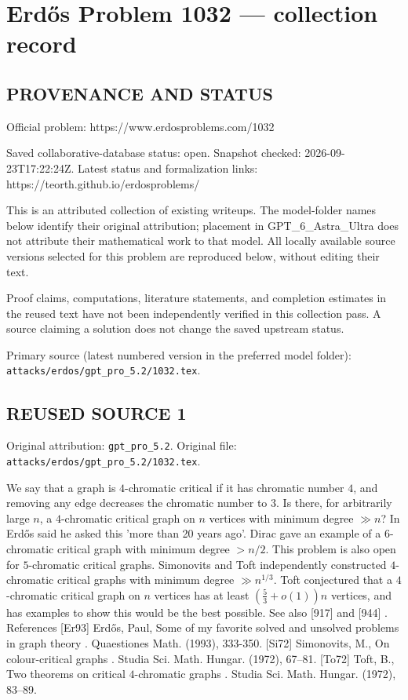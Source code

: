 \section*{Erd\H{o}s Problem 1032 --- collection record}

\subsection*{PROVENANCE AND STATUS}
Official problem: https://www.erdosproblems.com/1032

Saved collaborative-database status: open.
Snapshot checked: 2026-09-23T17:22:24Z.
Latest status and formalization links: https://teorth.github.io/erdosproblems/

This is an attributed collection of existing writeups. The model-folder names below identify their original attribution; placement in GPT\_6\_Astra\_Ultra does not attribute their mathematical work to that model. All locally available source versions selected for this problem are reproduced below, without editing their text.

Proof claims, computations, literature statements, and completion estimates in the reused text have not been independently verified in this collection pass. A source claiming a solution does not change the saved upstream status.

Primary source (latest numbered version in the preferred model folder): \texttt{attacks/erdos/gpt\_pro\_5.2/1032.tex}.

\subsection*{REUSED SOURCE 1}
Original attribution: \texttt{gpt\_pro\_5.2}.
Original file: \texttt{attacks/erdos/gpt\_pro\_5.2/1032.tex}.


We say that a graph is $4$-chromatic critical if it has chromatic number $4$, and removing any edge decreases the chromatic number to $3$. Is there, for arbitrarily large $n$, a $4$-chromatic critical graph on $n$ vertices with minimum degree $\gg n$? In \cite{Er93} Erd\H{o}s said he asked this 'more than 20 years ago'. Dirac gave an example of a $6$-chromatic critical graph with minimum degree $>n/2$. This problem is also open for $5$-chromatic critical graphs. Simonovits \cite{Si72} and Toft \cite{To72} independently constructed $4$-chromatic critical graphs with minimum degree $\gg n^{1/3}$. Toft conjectured that a $4$-chromatic critical graph on $n$ vertices has at least $(\frac{5}{3}+o(1))n$ vertices, and has examples to show this would be the best possible. See also [917] and [944] . References [Er93] Erd\H{o}s, Paul, Some of my favorite solved and unsolved problems in graph theory . Quaestiones Math. (1993), 333-350. [Si72] Simonovits, M., On colour-critical graphs . Studia Sci. Math. Hungar. (1972), 67--81. [To72] Toft, B., Two theorems on critical {$4$}-chromatic graphs . Studia Sci. Math. Hungar. (1972), 83--89.

